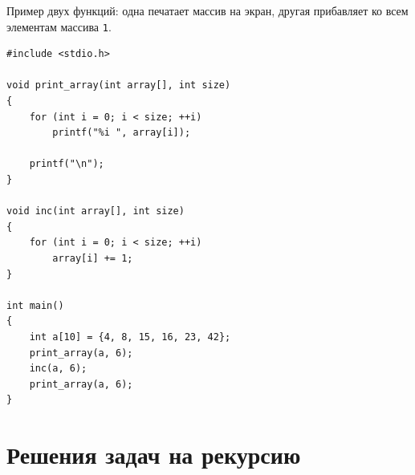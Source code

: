 \documentclass{article}
\begin{document}
Пример двух функций: одна печатает массив на экран, другая прибавляет ко всем элементам массива \texttt{1}.
\begin{lstlisting}
#include <stdio.h>

void print_array(int array[], int size) 
{
    for (int i = 0; i < size; ++i)
        printf("%i ", array[i]);
        
    printf("\n");
}

void inc(int array[], int size) 
{
    for (int i = 0; i < size; ++i)
        array[i] += 1;
}

int main() 
{
    int a[10] = {4, 8, 15, 16, 23, 42};
    print_array(a, 6);
    inc(a, 6);
    print_array(a, 6);
}
\end{lstlisting}


\section*{Решения задач на рекурсию}
\end{document}
